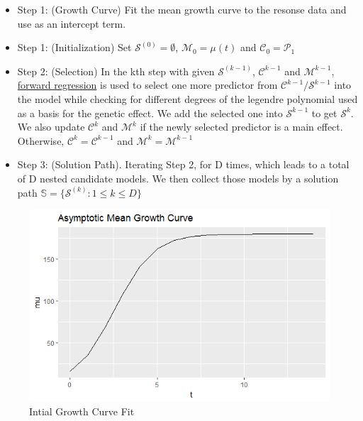 \documentclass[11pt,]{book}
\providecommand{\tightlist}{%
  \setlength{\itemsep}{0pt}\setlength{\parskip}{0pt}}
\theoremstyle{definition}
\theoremstyle{definition}
\theoremstyle{remark}
\begin{document}
\begin{itemize}
\tightlist
\item
  Step 1: (Growth Curve) Fit the mean growth curve to the resonse data
  and use as an intercept term.\\
\item
  Step 1: (Initialization) Set \(\mathcal{S}^{(0)} = \emptyset\),
  \(\mathcal{M}_0 = \mu(t)\) and \(\mathcal{C}_0 = \mathcal{P_1}\)
\item
  Step 2: (Selection) In the kth step with given
  \(\mathcal{S}^{(k-1)}\), \(\mathcal{C}^{k−1}\) and
  \(\mathcal{M}^{k−1}\), \protect\hyperlink{ux2f7}{forward regression}
  is used to select one more predictor from
  \(\mathcal{C}^{k−1}/ \mathcal{S}^{k−1}\) into the model while checking
  for different degrees of the legendre polynomial used as a basis for
  the genetic effect. We add the selected one into \(\mathcal{S}^{k−1}\)
  to get \(\mathcal{S}^k\). We also update \(\mathcal{C}^k\) and
  \(\mathcal{M}^k\) if the newly selected predictor is a main effect.
  Otherwise, \(\mathcal{C}^k = \mathcal{C}^{k−1}\) and
  \(\mathcal{M}^k = \mathcal{M}^{k−1}\)
\item
  Step 3: (Solution Path). Iterating Step 2, for D times, which leads to
  a total of D nested candidate models. We then collect those models by
  a solution path \(\mathbb{S}=\{\mathcal{S}^{(k)}: 1 \le k \le D\}\)
\end{itemize}

\begin{figure}

{\centering \includegraphics[width=0.8\linewidth]{images/GrowthCurveExample} 

}

\caption{Intial Growth Curve Fit}\label{fig:growth-example}
\end{figure}
\end{document}
